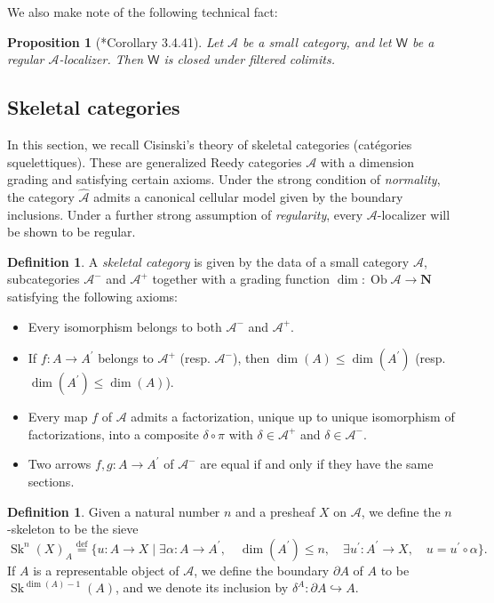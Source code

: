 \documentclass[a4paper]{article}
\numberwithin{equation}{subsection}
\theoremstyle{plain}   %
\newtheorem{prop}[equation]{Proposition}
\theoremstyle{definition}
\newtheorem{defn}[equation]{Definition}
\theoremstyle{remark}
\theoremstyle{plain}
\DeclareMathOperator{\Ob}{Ob}
\newcommand{\psh}[1]{\ensuremath{\widehat{#1}}}
\newcommand{\defeq}{\overset{\mathrm{def}}=}
\begin{document}
We also make note of the following technical fact:
\begin{prop}[\cite{cisinski-book}*{Corollary 3.4.41}]\label{filteredcolims}
	Let \(\mathcal{A}\) be a small category, and let \(\mathsf{W}\) be a regular \(\mathcal{A}\)-localizer.  Then \(\mathsf{W}\) is closed under filtered colimits.
\end{prop}
\subsection{Skeletal categories}
In this section, we recall Cisinski's theory of skeletal categories (cat\'egories squelettiques).  These are generalized Reedy categories \(\mathcal{A}\) with a dimension grading and satisfying certain axioms. Under the strong condition of \emph{normality}, the category \(\psh{\mathcal{A}}\) admits a canonical cellular model given by the boundary inclusions.  Under a further strong assumption of \emph{regularity}, every \(\mathcal{A}\)-localizer will be shown to be regular.
\begin{defn}
	A \emph{skeletal category} is given by the data of a small category \(\mathcal{A}\), subcategories \(\mathcal{A}^-\) and \(\mathcal{A}^+\) together with a grading function \(\operatorname{dim}:\Ob \mathcal{A} \to \mathbf{N}\) satisfying the following axioms:
	\begin{itemize}
		\item Every isomorphism belongs to both \(\mathcal{A}^-\) and \(\mathcal{A}^+\).
		\item If \(f:A\to A^\prime\) belongs to \(\mathcal{A}^+\) (resp. \(\mathcal{A}^-\)), then \(\dim(A) \leq \dim(A^\prime)\) (resp. \(\dim(A^\prime) \leq \dim(A)\)).
		\item Every map \(f\) of \(\mathcal{A}\) admits a factorization, unique up to unique isomorphism of factorizations, into a composite \(\delta \circ \pi\) with \(\delta \in \mathcal{A}^+\) and \(\delta \in \mathcal{A}^-\).
		\item Two arrows \(f,g:A\to A^\prime\) of \(\mathcal{A}^-\) are equal if and only if they have the same sections.
	\end{itemize}
\end{defn}
\begin{defn}
	Given a natural number \(n\) and a presheaf \(X\) on \(\mathcal{A}\), we define the \(n\)-skeleton to be the sieve
	\[
		\operatorname{Sk}^n(X)_A\defeq \{u:A\to X \mid \exists \alpha:A\to A^\prime, \quad \dim(A^\prime)\leq n, \quad \exists u^\prime:A^\prime \to X, \quad u=u^\prime\circ \alpha\}.
	\]
	If \(A\) is a representable object of \(\mathcal{A}\), we define the boundary \(\partial A\) of \(A\) to be  \(\operatorname{Sk}^{\dim(A)-1}(A)\), and we denote its inclusion by \(\delta^A:\partial A \hookrightarrow A\).  
\end{defn}
\end{document}
